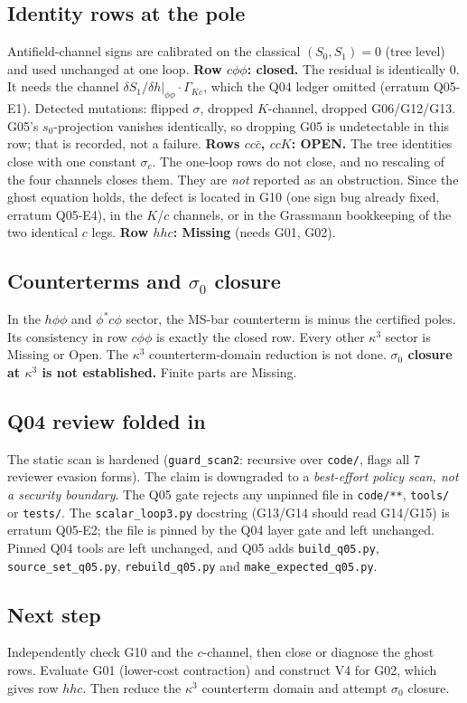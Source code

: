 \subsection*{Identity rows at the pole}
Antifield-channel signs are calibrated on the classical $(S_0,S_1)=0$ (tree level) and used unchanged at one loop.
\textbf{Row $c\phi\phi$: closed.} The residual is identically 0. It needs the channel $\delta S_1/\delta h|_{\phi\phi}\cdot\Gamma_{Kc}$,
which the Q04 ledger omitted (erratum Q05-E1). Detected mutations: flipped $\sigma$, dropped $K$-channel, dropped G06/G12/G13.
G05's $s_0$-projection vanishes identically, so dropping G05 is undetectable in this row; that is recorded, not a failure.
\textbf{Rows $cc\bar c$, $ccK$: OPEN.} The tree identities close with one constant $\sigma_c$. The one-loop rows do not
close, and no rescaling of the four channels closes them. They are \emph{not} reported as an obstruction. Since the ghost
equation holds, the defect is located in G10 (one sign bug already fixed, erratum Q05-E4), in the $K$/$c$ channels, or in
the Grassmann bookkeeping of the two identical $c$ legs. \textbf{Row $hhc$: Missing} (needs G01, G02).

\subsection*{Counterterms and $\sigma_0$ closure}
In the $h\phi\phi$ and $\phi^*c\phi$ sector, the MS-bar counterterm is minus the certified poles. Its consistency in row
$c\phi\phi$ is exactly the closed row. Every other $\kappa^3$ sector is Missing or Open. The $\kappa^3$ counterterm-domain
reduction is not done. \textbf{$\sigma_0$ closure at $\kappa^3$ is not established.} Finite parts are Missing.

\subsection*{Q04 review folded in}
The static scan is hardened (\texttt{guard\_scan2}: recursive over \texttt{code/}, flags all 7 reviewer evasion forms). The
claim is downgraded to a \emph{best-effort policy scan, not a security boundary}. The Q05 gate rejects any unpinned file in
\texttt{code/**}, \texttt{tools/} or \texttt{tests/}. The \texttt{scalar\_loop3.py} docstring (G13/G14 should read G14/G15)
is erratum Q05-E2; the file is pinned by the Q04 layer gate and left unchanged. Pinned Q04 tools are left unchanged, and Q05
adds \texttt{build\_q05.py}, \texttt{source\_set\_q05.py}, \texttt{rebuild\_q05.py} and \texttt{make\_expected\_q05.py}.

\subsection*{Next step}
Independently check G10 and the $c$-channel, then close or diagnose the ghost rows. Evaluate G01 (lower-cost contraction)
and construct V4 for G02, which gives row $hhc$. Then reduce the $\kappa^3$ counterterm domain and attempt $\sigma_0$ closure.
